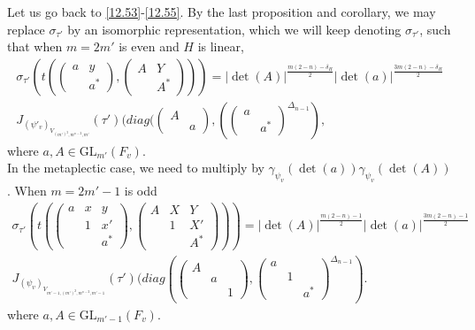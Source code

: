 \documentclass[12pts]{amsart}
\newcommand{\GL}{{\mathrm{GL}}}
\begin{document}
Let us go back to \eqref{12.53}-\eqref{12.55}. By the last proposition and corollary, we may replace $\sigma_{\tau'}$ by an isomorphic representation, which we will keep denoting $\sigma_{\tau'}$, such that when $m=2m'$ is even and $H$ is linear,
\begin{multline}\label{12.63}
\sigma_{\tau'}(t(\begin{pmatrix}a&y\\&a^*\end{pmatrix}, \begin{pmatrix}A&Y\\&A^*\end{pmatrix}))=|\det(A)|^{\frac{m(2-n)-\delta_H}{2}}|\det(a)|^{\frac{3m(2-n)-\delta_H}{2}}\\
 J_{(\psi'_v)_{V_{(m')^3,m^{n-2},m'}}}(\tau')(diag( \begin{pmatrix}A\\&a\end{pmatrix}, (\begin{pmatrix}a\\&a^*\end{pmatrix}^{\Delta_{n-1}}),
\end{multline}
where $a, A\in \GL_{m'}(F_v)$.\\
In the metaplectic case, we need to multiply by $\gamma_{\psi_v}(\det(a))\gamma_{\psi_v}(\det(A))$.
When $m=2m'-1$ is odd
\begin{multline}\label{12.63.1}
\sigma_{\tau'}(t(\begin{pmatrix}a&x&y\\&1&x'\\&&a^*\end{pmatrix}, \begin{pmatrix}A&X&Y\\&1&X'\\&&A^*\end{pmatrix}))=|\det(A)|^{\frac{m(2-n)-1}{2}}|\det(a)|^{\frac{3m(2-n)-1}{2}}\\
 J_{(\psi_v)_{V_{m'-1,(m')^2,m^{n-2},m'-1}}}(\tau')(diag( \begin{pmatrix}A\\&a\\&&1\end{pmatrix}, \begin{pmatrix}a\\&1\\&&a^*\end{pmatrix}^{\Delta_{n-1}}).
\end{multline}
where $a, A\in \GL_{m'-1}(F_v)$.
\end{document}
